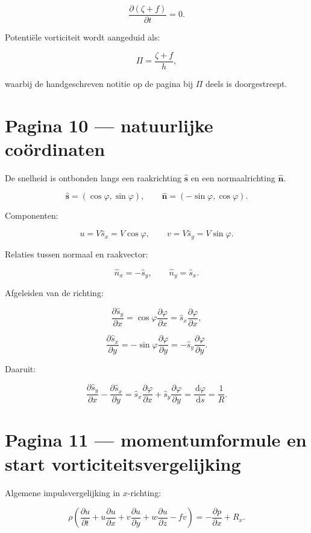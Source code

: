 \documentclass[11pt,a4paper]{article}
\newcommand{\vect}[1]{\mathbf{#1}}
\newcommand{\dd}{\,\mathrm{d}}
\begin{document}
$$
\frac{\partial(\zeta+f)}{\partial t}=0.
$$

Potentiële vorticiteit wordt aangeduid als:

$$
\Pi
=
\frac{\zeta+f}{h},
$$

waarbij de handgeschreven notitie op de pagina bij $\Pi$ deels is doorgestreept.

\newpage

\section*{Pagina 10 --- natuurlijke coördinaten}
De snelheid is ontbonden langs een raakrichting $\hat{\vect{s}}$ en een normaalrichting $\hat{\vect{n}}$.

$$
\hat{\vect{s}}
=
(\cos\varphi,\sin\varphi),
\qquad
\hat{\vect{n}}
=
(-\sin\varphi,\cos\varphi).
$$

Componenten:

$$
u
=
V\hat{s}_x
=
V\cos\varphi,
\qquad
v
=
V\hat{s}_y
=
V\sin\varphi.
$$

Relaties tussen normaal en raakvector:

$$
\hat{n}_x=-\hat{s}_y,
\qquad
\hat{n}_y=\hat{s}_x.
$$

Afgeleiden van de richting:

$$
\frac{\partial \hat{s}_y}{\partial x}
=
\cos\varphi\frac{\partial\varphi}{\partial x}
=
\hat{s}_x\frac{\partial\varphi}{\partial x},
$$

$$
\frac{\partial \hat{s}_x}{\partial y}
=
-\sin\varphi\frac{\partial\varphi}{\partial y}
=
-\hat{s}_y\frac{\partial\varphi}{\partial y}.
$$

Daaruit:

$$
\frac{\partial \hat{s}_y}{\partial x}
-
\frac{\partial \hat{s}_x}{\partial y}
=
\hat{s}_x\frac{\partial\varphi}{\partial x}
+
\hat{s}_y\frac{\partial\varphi}{\partial y}
=
\frac{\dd\varphi}{\dd s}
=
\frac{1}{R}.
$$

\newpage

\section*{Pagina 11 --- momentumformule en start vorticiteitsvergelijking}
Algemene impulsvergelijking in $x$-richting:

$$
\rho
\left(
\frac{\partial u}{\partial t}
+
u\frac{\partial u}{\partial x}
+
v\frac{\partial u}{\partial y}
+
w\frac{\partial u}{\partial z}
-
fv
\right)
=
-\frac{\partial p}{\partial x}
+
R_x.
$$
\end{document}

